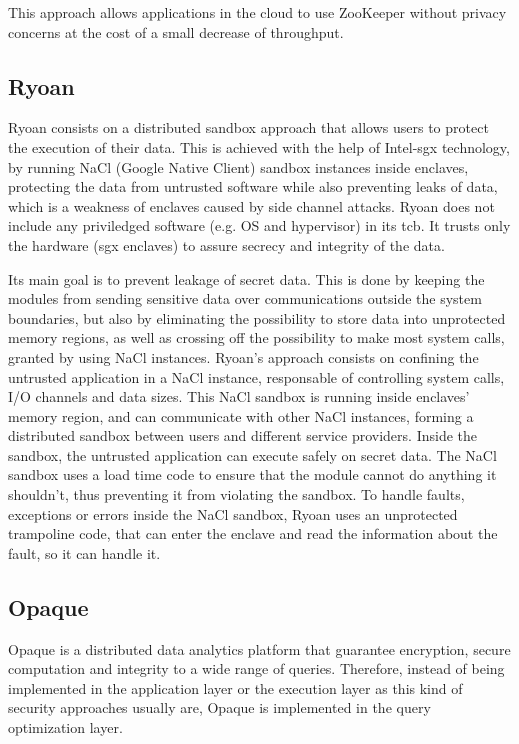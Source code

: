 This approach allows applications in the cloud to use ZooKeeper without privacy concerns at the cost of a small decrease of throughput.

\subsection{Ryoan}
\label{ssec:ryoan_sandboxing}

Ryoan \cite{ryoanPaper} consists on a distributed sandbox approach that allows users to protect the execution of their data. This is achieved with the help of Intel-\gls{sgx} \cite{intelSGX} \cite{sgxPaper} technology, by running NaCl (Google Native Client) sandbox instances inside enclaves, protecting the data from untrusted software while also preventing leaks of data, which is a weakness of enclaves caused by side channel attacks.
Ryoan does not include any priviledged software (e.g. OS and hypervisor) in its \gls{tcb}. It trusts only the hardware (\gls{sgx} enclaves) to assure secrecy and integrity of the data.

Its main goal is to prevent leakage of secret data. This is done by keeping the modules from sending sensitive data over communications outside the system boundaries, but also by eliminating the possibility to store data into unprotected memory regions, as well as crossing off the possibility to make most system calls, granted by using NaCl instances. 
Ryoan's approach consists on confining the untrusted application in a NaCl instance, responsable of controlling system calls, I/O channels and data sizes. This NaCl sandbox is running inside enclaves' memory region, and can communicate with other NaCl instances, forming a distributed sandbox between users and different service providers. Inside the sandbox, the untrusted application can execute safely on secret data. The NaCl sandbox uses a load time code to ensure that the module cannot do anything it shouldn't, thus preventing it from violating the sandbox. To handle faults, exceptions or errors inside the NaCl sandbox, Ryoan uses an unprotected trampoline code, that can enter the enclave and read the information about the fault, so it can handle it.
\subsection{Opaque}
\label{ssec:opaque}

Opaque \cite{opaquePaper} is a distributed data analytics platform that guarantee encryption, secure computation and integrity to a wide range of queries. Therefore, instead of being implemented in the application layer or the execution layer as this kind of security approaches usually are, Opaque is implemented in the query optimization layer. 

